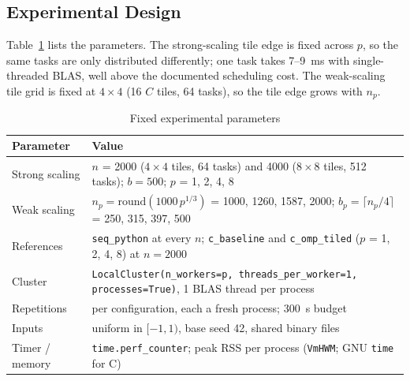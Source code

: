 \documentclass[conference,a4paper]{IEEEtran}
\newcommand{\code}[1]{\texttt{#1}}
\newcommand{\seqpy}{\code{seq\_python}}
\newcommand{\cseq}{\code{c\_baseline}}
\newcommand{\comp}{\code{c\_omp\_tiled}}
\begin{document}
\subsection{Experimental Design}
\label{sec:design}
Table~\ref{tab:parameters} lists the parameters. The strong-scaling tile
edge is fixed across $p$, so the same tasks are only distributed differently;
one task takes 7--9~ms with single-threaded BLAS, well above the documented
scheduling cost. The weak-scaling tile grid is fixed at $4 \times 4$ (16 $C$
tiles, 64 tasks), so the tile edge grows with $n_p$.

\begin{table}[t]
  \centering
  \caption{Fixed experimental parameters}
  \label{tab:parameters}
  \footnotesize
  \begin{tabular}{@{}l>{\raggedright\arraybackslash}p{}@{}}
    \toprule
    \textbf{Parameter} & \textbf{Value} \\
    \midrule
    Strong scaling & $n$ = 2000 ($4 \times 4$ tiles, 64 tasks) and 4000
                     ($8 \times 8$ tiles, 512 tasks); $b = 500$; $p$ = 1, 2, 4, 8 \\
    Weak scaling   & $n_p = \mathrm{round}(1000\, p^{1/3})$ = 1000, 1260, 1587, 2000;
                     $b_p = \lceil n_p/4 \rceil$ = 250, 315, 397, 500 \\
    References     & \seqpy{} at every $n$; \cseq{} and \comp{}
                     ($p$ = 1, 2, 4, 8) at $n = 2000$ \\
    Cluster        & \code{LocalCluster(n\_workers=p, threads\_per\_worker=1,
                     processes=True)}, 1 BLAS thread per process \\
    Repetitions    & 5 per configuration, each a fresh process; 300~s budget \\
    Inputs         & uniform in $[-1, 1)$, base seed 42, shared binary files \\
    Timer / memory & \code{time.perf\_counter}; peak RSS per process
                     (\code{VmHWM}; GNU \code{time} for C) \\
    \bottomrule
  \end{tabular}
\end{table}
\end{document}
